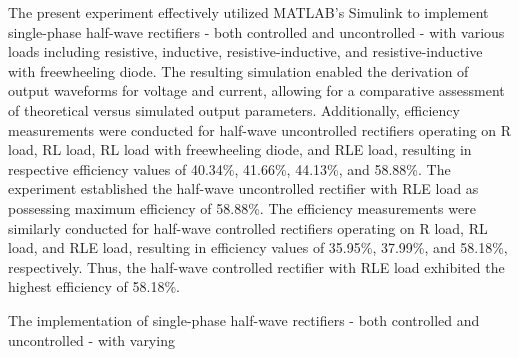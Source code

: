 The present experiment effectively utilized MATLAB's Simulink to implement single-phase half-wave rectifiers - both controlled and uncontrolled - with various loads including resistive, inductive, resistive-inductive, and resistive-inductive with freewheeling diode. The resulting simulation enabled the derivation of output waveforms for voltage and current, allowing for a comparative assessment of theoretical versus simulated output parameters. Additionally, efficiency measurements were conducted for half-wave uncontrolled rectifiers operating on R load, RL load, RL load with freewheeling diode, and RLE load, resulting in respective efficiency values of 40.34\%, 41.66\%, 44.13\%, and 58.88\%. The experiment established the half-wave uncontrolled rectifier with RLE load as possessing maximum efficiency of 58.88\%. The efficiency measurements were similarly conducted for half-wave controlled rectifiers operating on R load, RL load, and RLE load, resulting in efficiency values of 35.95\%, 37.99\%, and 58.18\%, respectively. Thus, the half-wave controlled rectifier with RLE load exhibited the highest efficiency of 58.18\%.

The implementation of single-phase half-wave rectifiers - both controlled and uncontrolled - with varying

\pagebreak
